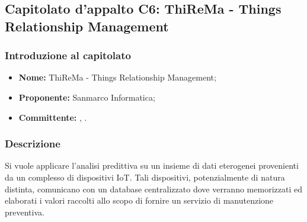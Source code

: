 \subsection{Capitolato d'appalto C6: ThiReMa - Things Relationship Management}
	\subsubsection{Introduzione al capitolato}
	\begin{itemize}
		\item \textbf{Nome:} ThiReMa - Things Relationship Management;
		\item \textbf{Proponente}\textbf{:} Sanmarco Informatica;
		\item \textbf{Committente}\textbf{:} \TV, \RC.
	\end{itemize}
	\subsubsection{Descrizione}
	Si vuole applicare l'analisi predittiva su un insieme di dati eterogenei provenienti da un complesso di dispositivi IoT. Tali dispositivi, potenzialmente di natura distinta, comunicano con un database centralizzato dove verranno memorizzati ed elaborati i valori raccolti allo scopo di fornire un servizio di manutenzione preventiva.  

